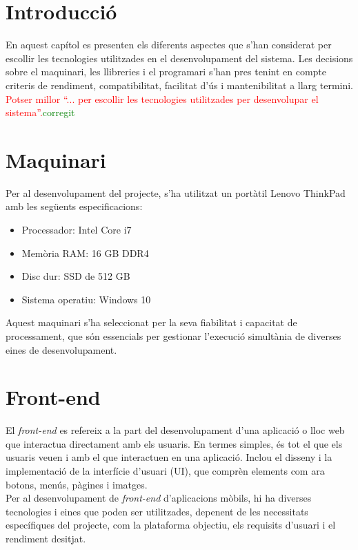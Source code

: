 \documentclass[a4paper,12pt,twoside]{ThesisStyle}
\newcommand{\pau}[1]{\textcolor{red}{#1}}
\newcommand{\sudan}[1]{\textcolor{green}{#1}}
\begin{document}
\section{Introducció}
\label{sec:Introducció}

En aquest capítol es presenten els diferents aspectes que s'han considerat per escollir les tecnologies utilitzades en el desenvolupament del sistema. Les decisions sobre el maquinari, les llibreries i el programari s'han pres tenint en compte criteris de rendiment, compatibilitat, facilitat d'ús i mantenibilitat a llarg termini.
 \pau{Potser millor ``... per escollir les tecnologies utilitzades per desenvolupar el sistema''.}\sudan{corregit}


 \section{Maquinari}
 \label{sec: Maquinari}

Per al desenvolupament del projecte, s'ha utilitzat un portàtil Lenovo ThinkPad amb les següents especificacions:

\begin{itemize}
    \item Processador: Intel Core i7
    \item Memòria RAM: 16 GB DDR4
    \item Disc dur: SSD de 512 GB
    \item Sistema operatiu: Windows 10
\end{itemize}

Aquest maquinari s'ha seleccionat per la seva fiabilitat i capacitat de processament, que són essencials per gestionar l'execució simultània de diverses eines de desenvolupament.



\section{Front-end}
\label{sec: Front-end}

El \textit{front-end} es refereix a la part del desenvolupament d'una aplicació o lloc web que interactua directament amb els usuaris. En termes simples, és tot el que els usuaris veuen i amb el que interactuen en una aplicació. Inclou el disseny i la implementació de la interfície d'usuari (UI), que comprèn elements com ara botons, menús, pàgines i imatges.\\

Per al desenvolupament de \textit{front-end} d'aplicacions mòbils, hi ha diverses tecnologies i eines que poden ser utilitzades, depenent de les necessitats específiques del projecte, com la plataforma objectiu, els requisits d'usuari i el rendiment desitjat. 
\end{document}
